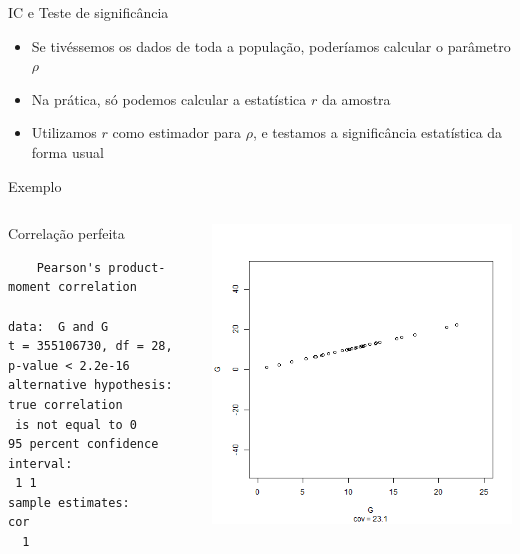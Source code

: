 \documentclass{beamer}
\begin{document}
\begin{frame}{\scriptsize IC e Teste de significância}
  \begin{itemize}
    \footnotesize
  \item Se tivéssemos os dados de toda a \alert<1>{população}, poderíamos
    calcular o \alert<1>{parâmetro} $\rho$
      \bigskip
  \item Na prática, só podemos calcular a \alert<2>{estatística} $r$ da \alert<2>{amostra}
      \bigskip
  \item Utilizamos $r$ como estimador para $\rho$, e testamos a
    significância estatística da forma usual
  \end{itemize}
\end{frame}

\begin{frame}[fragile]{\scriptsize Exemplo}
  \begin{columns}
    \begin{column}{6cm}
      \begin{exampleblock}{Correlação perfeita}
        \tiny
\begin{verbatim}
	Pearson's product-moment correlation

data:  G and G
t = 355106730, df = 28, p-value < 2.2e-16
alternative hypothesis: true correlation
 is not equal to 0
95 percent confidence interval:
 1 1
sample estimates:
cor 
  1
\end{verbatim}
      \end{exampleblock}
\end{column}
    \begin{column}{4cm}
      \begin{center}
        \includegraphics[height=.8\textheight]{Cap17/anim-0}
      \end{center}
    \end{column}
\end{columns}
\end{frame}
\end{document}
